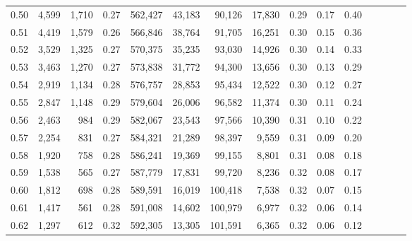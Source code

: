 \begin{tabular}{rrrcrrrrrrrrrrr}
0.50 &   4,599 &  1,710 &                                       0.27 &  562,427 &   43,183 &   90,126 &   17,830 &  0.29 &  0.17 &                         0.40 \\
0.51 &   4,419 &  1,579 &                                       0.26 &  566,846 &   38,764 &   91,705 &   16,251 &  0.30 &  0.15 &                         0.36 \\
0.52 &   3,529 &  1,325 &                                       0.27 &  570,375 &   35,235 &   93,030 &   14,926 &  0.30 &  0.14 &                         0.33 \\
0.53 &   3,463 &  1,270 &                                       0.27 &  573,838 &   31,772 &   94,300 &   13,656 &  0.30 &  0.13 &                         0.29 \\
0.54 &   2,919 &  1,134 &                                       0.28 &  576,757 &   28,853 &   95,434 &   12,522 &  0.30 &  0.12 &                         0.27 \\
0.55 &   2,847 &  1,148 &                                       0.29 &  579,604 &   26,006 &   96,582 &   11,374 &  0.30 &  0.11 &                         0.24 \\
0.56 &   2,463 &    984 &                                       0.29 &  582,067 &   23,543 &   97,566 &   10,390 &  0.31 &  0.10 &                         0.22 \\
0.57 &   2,254 &    831 &                                       0.27 &  584,321 &   21,289 &   98,397 &    9,559 &  0.31 &  0.09 &                         0.20 \\
0.58 &   1,920 &    758 &                                       0.28 &  586,241 &   19,369 &   99,155 &    8,801 &  0.31 &  0.08 &                         0.18 \\
0.59 &   1,538 &    565 &                                       0.27 &  587,779 &   17,831 &   99,720 &    8,236 &  0.32 &  0.08 &                         0.17 \\
0.60 &   1,812 &    698 &                                       0.28 &  589,591 &   16,019 &  100,418 &    7,538 &  0.32 &  0.07 &                         0.15 \\
0.61 &   1,417 &    561 &                                       0.28 &  591,008 &   14,602 &  100,979 &    6,977 &  0.32 &  0.06 &                         0.14 \\
0.62 &   1,297 &    612 &                                       0.32 &  592,305 &   13,305 &  101,591 &    6,365 &  0.32 &  0.06 &                         0.12 \\

\end{tabular}
